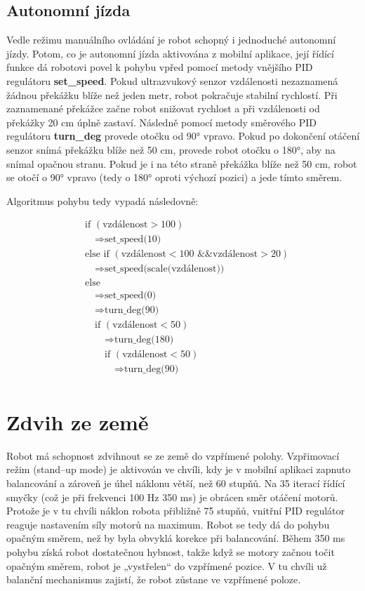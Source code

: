 \subsection*{Autonomní jízda}
Vedle režimu manuálního ovládání je robot schopný i jednoduché autonomní jízdy. Potom, co je autonomní jízda aktivována z mobilní aplikace, její řídící funkce dá robotovi povel k pohybu vpřed pomocí metody vnějšího PID regulátoru \textbf{set\_speed}. Pokud ultrazvukový senzor vzdálenosti nezaznamená žádnou překážku blíže než jeden metr, robot pokračuje stabilní rychlostí. Při zaznamenané překážce začne robot snižovat rychlost a při vzdálenosti od překážky 20 cm úplně zastaví. Následně pomocí metody směrového PID regulátoru \textbf{turn\_deg} provede otočku od 90° vpravo. Pokud po dokončení otáčení senzor snímá překážku blíže než 50 cm, provede robot otočku o 180°, aby na snímal opačnou stranu. Pokud je i na této straně překážka blíže než 50 cm, robot se otočí o 90° vpravo (tedy o 180° oproti výchozí pozici) a jede tímto směrem.

Algoritmus pohybu tedy vypadá následovně:

\begin{align*}
&\text{if } \left(\text{vzdálenost} > 100 \right) \\
&\quad \Rightarrow \text{set\_speed(10)} \\
&\text{else if } \left(\text{vzdálenost} < 100 \text{ \&\& } \text{vzdálenost} > 20\right) \\
&\quad \Rightarrow \text{set\_speed(scale(vzdálenost))} \\
&\text{else} \\
&\quad \Rightarrow \text{set\_speed(0)} \\
&\quad \Rightarrow \text{turn\_deg(90)} \\
&\quad \text{if } \left(\text{vzdálenost} < 50 \right) \\
&\qquad \Rightarrow \text{turn\_deg(180)} \\
&\qquad \text{if } \left(\text{vzdálenost} < 50 \right) \\
&\quad\qquad \Rightarrow \text{turn\_deg(90)} \\
\end{align*}

\section{Zdvih ze země}
\label{zdvih}
Robot má schopnost zdvihnout se ze země do vzpřímené polohy. Vzpřimovací režim (stand--up mode) je aktivován ve chvíli, kdy je v mobilní aplikaci zapnuto balancování a zároveň je úhel náklonu větší, než 60 stupňů. Na 35 iterací řídící smyčky (což je při frekvenci 100 Hz 350 ms) je obrácen směr otáčení motorů. Protože je v tu chvíli náklon robota přibližně 75 stupňů, vnitřní PID regulátor reaguje nastavením síly motorů na maximum. Robot se tedy dá do pohybu opačným směrem, než by byla obvyklá korekce při balancování. Během 350 ms pohybu získá robot dostatečnou hybnost, takže když se motory začnou točit opačným směrem, robot je „vystřelen“ do vzpřímené pozice. V tu chvíli už balanční mechanismus zajistí, že robot zůstane ve vzpřímené poloze. 

